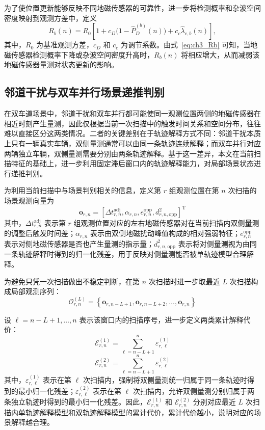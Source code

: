 \documentclass{xdupgthesis}
\begin{document}
为了使位置更新能够反映不同地磁传感器的可靠性，进一步将检测概率和杂波空间密度映射到观测方差中，定义
\begin{equation}
	R_b(n)
	=
	R_0\left[1+c_D\bigl(1-\hat P_D^{(b)}(n)\bigr)+c_c\hat\lambda_{c,b}(n)\right],
	\label{eq:ch3_Rb}
\end{equation}
其中，$R_0$ 为基准观测方差，$c_D$ 和 $c_c$ 为调节系数。由式~\eqref{eq:ch3_Rb} 可知，当地磁传感器检测概率下降或杂波空间密度升高时，$R_b(n)$ 将相应增大，从而减弱该地磁传感器量测对状态更新的影响。

\subsection{邻道干扰与双车并行场景递推判别}

在双车道场景中，邻道干扰和双车并行都可能使同一观测位置两侧的地磁传感器在相近时刻产生量测，因此仅根据当前一次扫描中的触发时间关系和空间分布，往往难以直接区分这两类情况。二者的关键差别在于轨迹解释方式不同：邻道干扰本质上只有一辆真实车辆，双侧量测通常可以由同一条轨迹连续解释；而双车并行对应两辆独立车辆，双侧量测需要分别由两条轨迹解释。基于这一差异，本文在当前扫描特征的基础上，进一步利用固定滞后窗口内的轨迹解释能力，对局部场景状态进行递推判别。

为利用当前扫描中与场景判别相关的信息，定义第 $r$ 组观测位置在第 $n$ 次扫描的场景观测向量为
\begin{equation}
	\mathbf o_{r,n}
	=
	\left[
	\Delta t_{r,n}^{\mathrm{adj}},
	\alpha_{r,n},
	e_{r,n}^{\mathrm{opp}},
	d_{r,n,\mathrm{opp}}^2
	\right]^{\mathrm T}
\end{equation}
其中，$\Delta t_{r,n}^{\mathrm{adj}}$ 表示第 $r$ 组观测位置对应的左右地磁传感器对在当前扫描内双侧量测的调整后触发时间差；$\alpha_{r,n}$ 表示由双侧地磁扰动峰值构成的相对强弱特征；$e_{r,n}^{\mathrm{opp}}$ 表示对侧地磁传感器是否也产生量测的指示量；$d_{r,n,\mathrm{opp}}^2$ 表示将对侧量测视为由同一条轨迹解释时得到的归一化残差，用于反映对侧量测能否被单轨迹模型合理解释。

为避免只凭一次扫描做出不稳定判断，在第 $n$ 次扫描时进一步取最近 $L$ 次扫描构成局部观测序列：
\begin{equation}
	\mathcal O_{r,n}^{(L)}
	=
	\left\{
	\mathbf o_{r,n-L+1},
	\mathbf o_{r,n-L+2},
	\ldots,
	\mathbf o_{r,n}
	\right\}
\end{equation}

设 $\ell=n-L+1,\ldots,n$ 表示该窗口内的扫描序号，进一步定义两类累计解释代价：
\begin{equation}
	\mathcal E_{r,n}^{(1)}
	=
	\sum_{\ell=n-L+1}^{n}\varepsilon_{r,\ell}^{(1)}
\end{equation}
\begin{equation}
	\mathcal E_{r,n}^{(2)}
	=
	\sum_{\ell=n-L+1}^{n}\varepsilon_{r,\ell}^{(2)}
\end{equation}
其中，$\varepsilon_{r,\ell}^{(1)}$ 表示在第 $\ell$ 次扫描内，强制将双侧量测统一归属于同一条轨迹时得到的最小归一化残差；$\varepsilon_{r,\ell}^{(2)}$ 表示在第 $\ell$ 次扫描内，允许双侧量测分别归属于两条独立轨迹时得到的最小归一化残差。因此，$\mathcal E_{r,n}^{(1)}$ 和 $\mathcal E_{r,n}^{(2)}$ 分别对应最近 $L$ 次扫描内单轨迹解释模型和双轨迹解释模型的累计代价，累计代价越小，说明对应的场景解释越合理。
\end{document}
